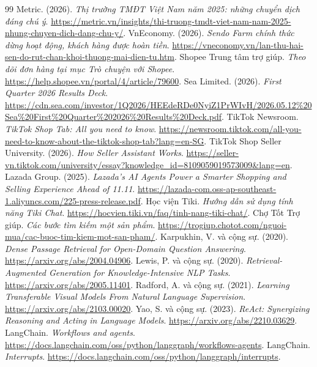 \documentclass[12pt,a4paper,oneside]{report}
\begin{document}
\begin{thebibliography}{99}
 Metric. (2026). \emph{Thị trường TMĐT Việt Nam năm 2025: những chuyển dịch đáng chú ý}. \url{https://metric.vn/insights/thi-truong-tmdt-viet-nam-nam-2025-nhung-chuyen-dich-dang-chu-y/}.
 VnEconomy. (2026). \emph{Sendo Farm chính thức dừng hoạt động, khách hàng được hoàn tiền}. \url{https://vneconomy.vn/lan-thu-hai-sen-do-rut-chan-khoi-thuong-mai-dien-tu.htm}.
 Shopee Trung tâm trợ giúp. \emph{Theo dõi đơn hàng tại mục Trò chuyện với Shopee}. \url{https://help.shopee.vn/portal/4/article/79600}.
 Sea Limited. (2026). \emph{First Quarter 2026 Results Deck}. \url{https://cdn.sea.com/investor/1Q2026/HEEdeRDe0NyiZ1PrWIvH/2026.05.12%20Sea%20First%20Quarter%202026%20Results%20Deck.pdf}.
 TikTok Newsroom. \emph{TikTok Shop Tab: All you need to know}. \url{https://newsroom.tiktok.com/all-you-need-to-know-about-the-tiktok-shop-tab?lang=en-SG}.
 TikTok Shop Seller University. (2026). \emph{How Seller Assistant Works}. \url{https://seller-vn.tiktok.com/university/essay?knowledge_id=8109059019573009&lang=en}.
 Lazada Group. (2025). \emph{Lazada's AI Agents Power a Smarter Shopping and Selling Experience Ahead of 11.11}. \url{https://lazada-com.oss-ap-southeast-1.aliyuncs.com/225-press-release.pdf}.
 Học viện Tiki. \emph{Hướng dẫn sử dụng tính năng Tiki Chat}. \url{https://hocvien.tiki.vn/faq/tinh-nang-tiki-chat/}.
 Chợ Tốt Trợ giúp. \emph{Các bước tìm kiếm một sản phẩm}. \url{https://trogiup.chotot.com/nguoi-mua/cac-buoc-tim-kiem-mot-san-pham/}.
 Karpukhin, V. và cộng sự. (2020). \emph{Dense Passage Retrieval for Open-Domain Question Answering}. \url{https://arxiv.org/abs/2004.04906}.
 Lewis, P. và cộng sự. (2020). \emph{Retrieval-Augmented Generation for Knowledge-Intensive NLP Tasks}. \url{https://arxiv.org/abs/2005.11401}.
 Radford, A. và cộng sự. (2021). \emph{Learning Transferable Visual Models From Natural Language Supervision}. \url{https://arxiv.org/abs/2103.00020}.
 Yao, S. và cộng sự. (2023). \emph{ReAct: Synergizing Reasoning and Acting in Language Models}. \url{https://arxiv.org/abs/2210.03629}.
 LangChain. \emph{Workflows and agents}. \url{https://docs.langchain.com/oss/python/langgraph/workflows-agents}.
 LangChain. \emph{Interrupts}. \url{https://docs.langchain.com/oss/python/langgraph/interrupts}.
\end{thebibliography}
\end{document}
